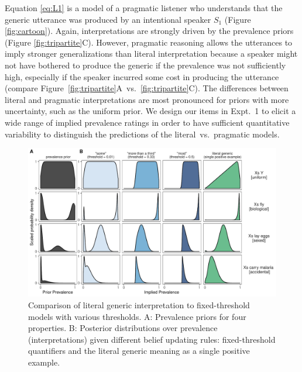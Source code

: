 \documentclass[floatsintext,doc]{apa6}
\begin{document}
Equation \ref{eq:L1} is a model of a pragmatic listener who understands that the generic utterance was produced by an intentional speaker \(S_1\) (Figure \ref{fig:cartoon}).
Again, interpretations are strongly driven by the prevalence priors (Figure \ref{fig:tripartite}C). 
However, pragmatic reasoning allows the utterances to imply stronger generalizations than literal interpretation because a speaker might not have bothered to produce the generic if the prevalence was not sufficiently high, especially if the speaker incurred some cost in producing the utterance (compare Figure~\ref{fig:tripartite}A~vs.~\ref{fig:tripartite}C).
The differences between literal and pragmatic interpretations are most pronounced for priors with more uncertainty, such as the uniform prior. 
We design our items in Expt.~1 to elicit a wide range of implied prevalence ratings in order to have sufficient quantitative variability to distinguish the predictions of the literal~vs.~pragmatic models.




\begin{figure}
\centering
\includegraphics{figs/modelSimulations-noPrag.pdf}
\caption{\label{fig:modelSimulations}Comparison of literal generic interpretation to fixed-threshold models with various thresholds. A: Prevalence priors for four properties. B: Posterior distributions over prevalence (interpretations) given different belief updating rules: fixed-threshold quantifiers and the literal generic meaning as a single positive example.}
\end{figure}
\end{document}
